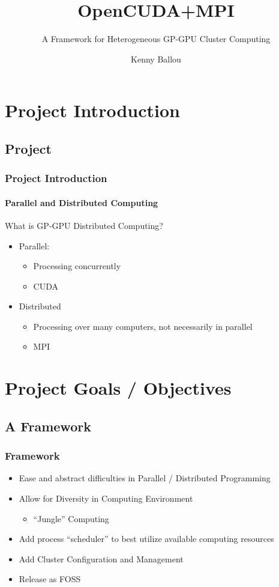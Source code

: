 \documentclass{beamer}
\title{OpenCUDA+MPI}
\subtitle{A Framework for Heterogeneous GP-GPU Cluster Computing}
\author[Ballou]{Kenny Ballou}
\begin{document}
\begin{frame}[label=titleslide]
\titlepage
\end{frame}
\begin{frame}
\tableofcontents[subsectionstyle=hide]
\end{frame}
\section{Project Introduction}
\subsection{Project}
\begin{frame}
\frametitle{Project Introduction}
\framesubtitle{Parallel and Distributed Computing}
What is GP-GPU Distributed Computing?
\begin{itemize}
\item{Parallel:}
\begin{itemize}
\item{Processing concurrently}
\item{CUDA}
\end{itemize}
\item{Distributed}
\begin{itemize}
\item{Processing over many computers, not necessarily in parallel}
\item{MPI}
\end{itemize}
\end{itemize}
\end{frame}
\section{Project Goals / Objectives}
\subsection{A Framework}
\begin{frame}
\frametitle{Framework}
\begin{itemize}
\item{Ease and abstract difficulties in Parallel / Distributed Programming}
\item{Allow for Diversity in Computing Environment}
\begin{itemize}
\item{``Jungle'' Computing}
\end{itemize}
\item{Add process ``scheduler'' to best utilize available computing resources}
\item{Add Cluster Configuration and Management}
\item{Release as FOSS}
\end{itemize}
\end{frame}
\end{document}
